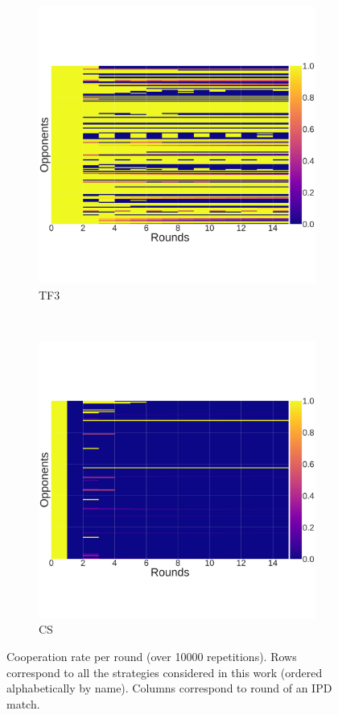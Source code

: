\documentclass[10pt,letterpaper]{article}
\begin{document}
\begin{figure}[!hbtp]
    \begin{subfigure}[t]{.5\columnwidth}
        \centering
        \includegraphics[width=\columnwidth]{./cooperation_0_0_10000_TF3_array.pdf}
        \caption{TF3}
    \end{subfigure}%
    ~
    \begin{subfigure}[t]{.5\columnwidth}
        \centering
        \includegraphics[width=\columnwidth]{./cooperation_0_0_10000_CS_array.pdf}
        \caption{CS}
    \end{subfigure}
    \caption{Cooperation rate per round (over 10000 repetitions). Rows
        correspond to all the strategies considered in this work (ordered
    alphabetically by name). Columns correspond to round of an IPD match.}
    \label{fig:cooperation_rates}
\end{figure}
\end{document}
